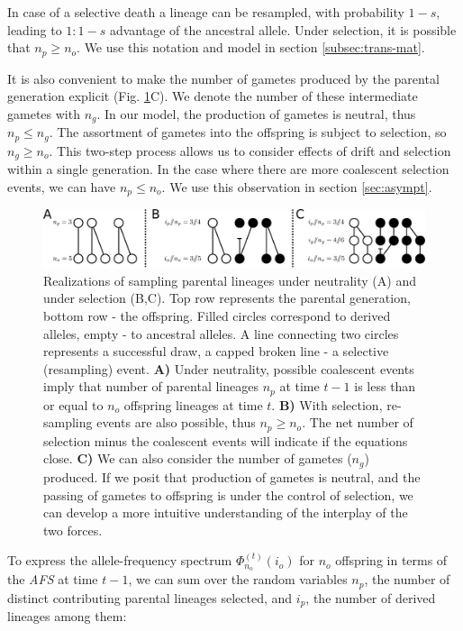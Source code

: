 \documentclass[review]{elsarticle}
\newcommand{\afs}[2]{\Phi_{#1}^{(#2)}}
\begin{document}
In case of a selective death a lineage can be resampled, with probability $1-s$, leading to $1:1-s$
advantage of the ancestral allele. Under selection, it is possible that $n_p \ge n_o$. We use this
notation and model in section \ref{subsec:trans-mat}.

It is also convenient to make the number of gametes produced by the parental generation explicit
(Fig. \ref{fig:schematic}C). We denote the number of these intermediate gametes with $n_g$. In our
model, the production of gametes is neutral, thus $n_p \le n_g$. The assortment of gametes into the
offspring is subject to selection, so $n_g \ge n_o$. This two-step process allows us to consider
effects of drift and selection within a single generation. In the case where there are more
coalescent selection events, we can have $n_p \le n_o$. We use this observation in section \ref{sec:asympt}.

\begin{figure}[ht]
  \centering
  \includegraphics[width=1.0\textwidth]{fig/schematic.pdf}
  \caption{\label{fig:schematic} Realizations of sampling parental lineages under neutrality (A) and
    under selection (B,C). Top row represents the parental generation, bottom row - the offspring.
    Filled circles correspond to derived alleles, empty - to ancestral alleles. A line connecting
    two circles represents a successful draw, a capped broken line - a selective (resampling) event.
    \textbf{A)} Under neutrality, possible coalescent events imply that number of parental lineages
    $n_p$ at time $t-1$ is less than or equal to $n_o$ offspring lineages at time $t$. \textbf{B)}
    With selection, re-sampling events are also possible, thus $n_p \ge n_o$. The net number of
    selection minus the coalescent events will indicate if the equations close. \textbf{C)} We can
    also consider the number of gametes ($n_g$) produced. If we posit that production of gametes is
    neutral, and the passing of gametes to offspring is under the control of selection, we can
    develop a more intuitive understanding of the interplay of the two forces. }
\end{figure}

To express the allele-frequency spectrum $\afs{n_o}{t}(i_o)$ for $n_o$ offspring in terms of the
\textit{AFS} at time $t-1$, we can sum over the random variables $n_p$, the number of distinct
contributing parental lineages selected, and $i_p$, the number of derived lineages among them:
\end{document}
